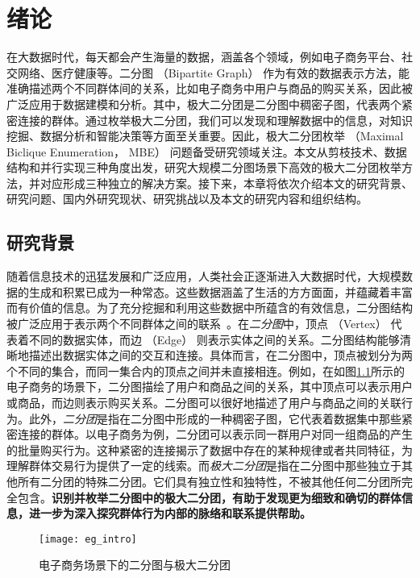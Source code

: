 \chapter{绪论}

在大数据时代，每天都会产生海量的数据，涵盖各个领域，例如电子商务平台、社交网络、医疗健康等。二分图 （Bipartite Graph） 作为有效的数据表示方法，能准确描述两个不同群体间的关系，比如电子商务中用户与商品的购买关系，因此被广泛应用于数据建模和分析。其中，极大二分团是二分图中稠密子图，代表两个紧密连接的群体。通过枚举极大二分团，我们可以发现和理解数据中的信息，对知识挖掘、数据分析和智能决策等方面至关重要。因此，极大二分团枚举 （Maximal Biclique Enumeration， MBE） 问题备受研究领域关注。本文从剪枝技术、数据结构和并行实现三种角度出发，研究大规模二分图场景下高效的极大二分团枚举方法，并对应形成三种独立的解决方案。接下来，本章将依次介绍本文的研究背景、研究问题、国内外研究现状、研究挑战以及本文的研究内容和组织结构。


\section{研究背景}

随着信息技术的迅猛发展和广泛应用，人类社会正逐渐进入大数据时代，大规模数据的生成和积累已成为一种常态。这些数据涵盖了生活的方方面面，并蕴藏着丰富而有价值的信息。为了充分挖掘和利用这些数据中所蕴含的有效信息，二分图结构被广泛应用于表示两个不同群体之间的联系~\cite{bipartite22}。在\emph{二分图}中，顶点 （Vertex） 代表着不同的数据实体，而边 （Edge） 则表示实体之间的关系。二分图结构能够清晰地描述出数据实体之间的交互和连接。具体而言，在二分图中，顶点被划分为两个不同的集合，而同一集合内的顶点之间并未直接相连。例如，在如图\ref{fig:eg_intro}所示的电子商务的场景下，二分图描绘了用户和商品之间的关系，其中顶点可以表示用户或商品，而边则表示购买关系。二分图可以很好地描述了用户与商品之间的关联行为。此外，\emph{二分团}是指在二分图中形成的一种稠密子图，它代表着数据集中那些紧密连接的群体。以电子商务为例，二分团可以表示同一群用户对同一组商品的产生的批量购买行为。这种紧密的连接揭示了数据中存在的某种规律或者共同特征，为理解群体交易行为提供了一定的线索。而\emph{极大二分团}是指在二分图中那些独立于其他所有二分团的特殊二分团。它们具有独立性和独特性，不被其他任何二分团所完全包含。\textbf{识别并枚举二分图中的极大二分团，有助于发现更为细致和确切的群体信息，进一步为深入探究群体行为内部的脉络和联系提供帮助。}

\begin{figure} [ht]
  \centering
  \vspace{0.05in}
  \texttt{[image: eg\_intro]}
  \vspace{0.05in}
  \caption{电子商务场景下的二分图与极大二分团}
  \label{fig:eg_intro}
\end{figure}



